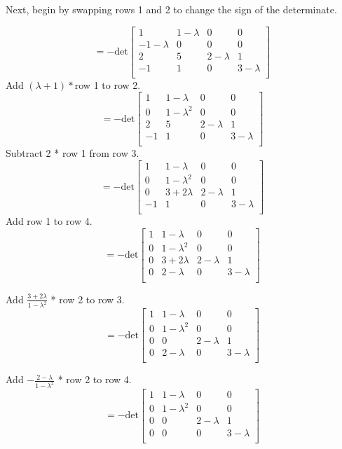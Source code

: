 \documentclass[11pt,addpoints]{exam}
\begin{document}
\begin{questions}
Next, begin by swapping rows 1 and 2 to change the sign of the determinate.

\[
= -\text{det}\begin{bmatrix}
1 & 1-\lambda & 0 & 0 \\
-1-\lambda & 0 & 0 & 0 \\
2 & 5 & 2 - \lambda & 1 \\
-1 & 1 & 0 & 3 - \lambda \\
\end{bmatrix}
\]
Add $(\lambda + 1) * $row 1 to row 2.
\[
= -\text{det}\begin{bmatrix}
1 & 1-\lambda & 0 & 0 \\
0 & 1-\lambda^2 & 0 & 0 \\
2 & 5 & 2 - \lambda & 1 \\
-1 & 1 & 0 & 3 - \lambda \\
\end{bmatrix}
\]
Subtract 2 * row 1 from row 3.
\[
= -\text{det}\begin{bmatrix}
1 & 1-\lambda & 0 & 0 \\
0 & 1-\lambda^2 & 0 & 0 \\
0 & 3+2\lambda & 2 - \lambda & 1 \\
-1 & 1 & 0 & 3 - \lambda \\
\end{bmatrix}
\]
Add row 1 to row 4.
\[
= -\text{det}\begin{bmatrix}
1 & 1-\lambda & 0 & 0 \\
0 & 1-\lambda^2 & 0 & 0 \\
0 & 3+2\lambda & 2 - \lambda & 1 \\
0 & 2-\lambda & 0 & 3 - \lambda \\
\end{bmatrix}
\]

Add $\frac{3 + 2\lambda}{1 - \lambda^2}$ * row 2 to row 3.
\[
= -\text{det}\begin{bmatrix}
1 & 1-\lambda & 0 & 0 \\
0 & 1-\lambda^2 & 0 & 0 \\
0 & 0 & 2 - \lambda & 1 \\
0 & 2-\lambda & 0 & 3 - \lambda \\
\end{bmatrix}
\]

Add $-\frac{2 -\lambda}{1 - \lambda^2}$ * row 2 to row 4.
\[
= -\text{det}\begin{bmatrix}
1 & 1-\lambda & 0 & 0 \\
0 & 1-\lambda^2 & 0 & 0 \\
0 & 0 & 2 - \lambda & 1 \\
0 & 0 & 0 & 3 - \lambda \\
\end{bmatrix}
\]


\end{questions}
\end{document}
